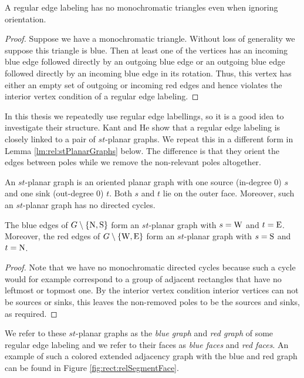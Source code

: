   \begin{lemma}
    \label{lm:rel:noMonoColoredTriangles}
    A regular edge labeling has no monochromatic triangles even when ignoring orientation.
  \end{lemma}

  \begin{proof}
    Suppose we have a monochromatic triangle. Without loss of generality we suppose this triangle is blue. Then at least one of the vertices has an incoming blue edge followed directly by an outgoing blue edge or an outgoing blue edge followed directly by an incoming blue edge in its rotation. Thus, this vertex has either an empty set of outgoing or incoming red edges and hence violates the interior vertex condition of a regular edge labeling.
  \end{proof}

    In this thesis we repeatedly use regular edge labellings, so it is a good idea to investigate their structure.
    Kant and He \cite{Kant1997} show that a regular edge labeling is closely linked to a pair of $st$-planar graphs. We repeat this in a different form in Lemma \ref{lm:rel:stPlanarGraphs} below. The difference is that they orient the edges between poles while we remove the non-relevant poles altogether. 

    An $st$-planar graph is an oriented planar graph with one source (in-degree 0) $s$ and one sink (out-degree 0) $t$. Both $s$ and $t$ lie on the outer face. Moreover, such an $st$-planar graph has no directed cycles.

    \begin{lemma}
      \label{lm:rel:stPlanarGraphs}
      The blue edges of $G\setminus \left\lbrace {\mathrm{N},\mathrm{S}} \right\rbrace$ form an $st$-planar graph with $s= \mathrm{W}$ and $t=\mathrm{E}$. Moreover, the red edges of $G\setminus \left\lbrace {\mathrm{W},\mathrm{E}} \right\rbrace$ form an $st$-planar graph with $s= \mathrm{S}$ and $t= \mathrm{N}$.
    \end{lemma}
    \begin{proof}
      Note that we have no monochromatic directed cycles because such a cycle would for example correspond to a  group of adjacent rectangles that have  no leftmost or topmost one. By the interior vertex condition interior vertices can not be sources or sinks, this leaves the non-removed poles to be the sources and sinks, as required.
    \end{proof}

    We refer to these $st$-planar graphs as the \emph{blue graph} and \emph{red graph} of some regular edge labeling and we refer to their faces as \emph{blue faces} and \emph{red faces}. An example of such a colored extended adjacency graph with the blue and red graph can be found in Figure \ref{fig:rect:relSegmentFace}.

